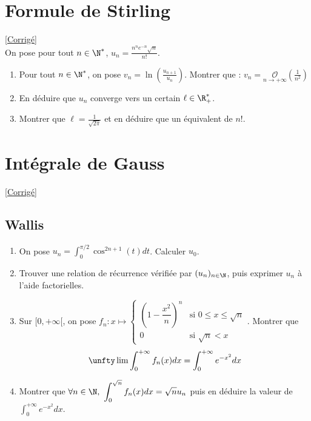 \documentclass{book}
\begin{document}
	\section{Formule de Stirling }
	\textcolor{blue}{\hyperref[Formule de Stirling corrgié]{[Corrigé]}}\\
	\label{stirling}
	\label{Formule de Stirling}
	On pose pour tout $n\in\N^*$, $\displaystyle u_n=\frac{n^ne^{-n}\sqrt{n}}{n!}$.
	\begin{enumerate}
		\item Pour tout $n\in\N^*$, on pose $v_n=\ln\left(\frac{u_{n+1}}{u_n}\right)$. Montrer que : \(v_n=\underset{n\to+\infty}{\mathcal{O}}\left(\frac{1}{n^2}\right)\)
		\item En déduire que $u_n$ converge vers un certain $\ell\in\R^*_+$.
		\item Montrer que \(\displaystyle\ell=\frac{1}{\sqrt{2\pi}}\) et en déduire que un équivalent de $n!$.
	\end{enumerate}
	
	\section{Intégrale de Gauss}
	\textcolor{blue}{\hyperref[Intégrale de Gauss corrigé]{[Corrigé]}}
	\label{gauss}
	\label{Intégrale de Gauss}
	
	\subsection{Wallis }
	\begin{enumerate}[leftmargin=*]
		\item On pose $u_n=\displaystyle\int_0^{\pi/2}\cos^{2n+1}(t)dt$. Calculer $u_0$.
		\item Trouver une relation de récurrence vérifiée par $(u_n)_{n\in \N}$, puis exprimer $u_n$ à l'aide factorielles.
		\item Sur $[0,+\infty[$, on pose $f_n:x\mapsto \begin{cases}
			\left(1-\dfrac{x^2}{n}\right)^n&\mbox{si }0\leq x\leq \sqrt n\\
			0&\mbox{si }\sqrt n<x
		\end{cases}$. Montrer que
		$$\unfty\lim \int_0^{+\infty}f_n(x)dx=\int_0^{+\infty}e^{-x^2}dx$$
		\item Montrer que $\forall n\in \N,\ \displaystyle\int_0^{\sqrt n}f_n(x)dx=\sqrt nu_n$ puis en déduire la valeur de $\displaystyle\int_0^{+\infty}e^{-x^2}dx$.
	\end{enumerate}
	
\end{document}
